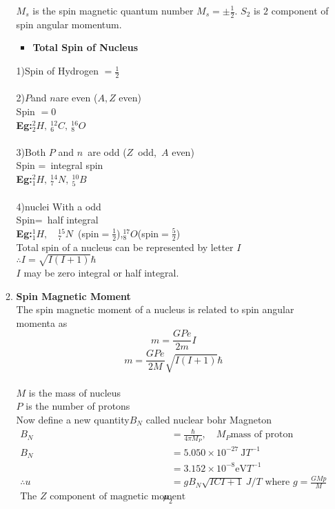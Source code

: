 \begin{enumerate}
\begin{enumerate}
$M_s$ is the spin magnetic quantum number $M_s=\pm\frac{1}{2}$. $S_2$ is $2 $ component of spin angular momentum.
\begin{itemize}
	\item \textbf{Total Spin of Nucleus}
\end{itemize}
1)\quad Spin of Hydrogen $=\frac{1}{2}$\\\\
2)\quad $P$and $n$are even ($A,Z$ even)\\
Spin $=0$\\
\textbf{Eg:}\quad $^2_2 H,\  ^{12}_6 C,\ ^{16}_8 O$\\\\
3)\quad Both $P$ and $n$\ are odd ($Z$\ odd,\ $A$ even)\\
Spin =\ integral spin\\
\textbf{Eg:}\quad $^2_1 H,\  ^{14}_7 N,\ ^{10}_5 B$\\\\
4)\quad nuclei With a odd\\
Spin=\ half integral\\
\textbf{Eg:}\quad $^1_1 H,\quad ^{15}_7 N$\ (spin$=\frac{1}{2}$),\quad$^{17}_8 O$(spin$=\frac{5}{2}$)\\
Total spin of a nucleus can be represented by letter $I$\\
$\therefore I=\sqrt{I(I+1)}\hbar$\\
$I$ may be zero integral or half integral.\\
	\item \textbf{Spin Magnetic Moment}\\
The spin magnetic moment of a nucleus is related to spin angular momenta as $$m=\frac{GPe}{2m}I$$
$$m=\frac{GPe}{2M}\sqrt{I(I+1)}\hbar$$\\
$M$ is the mass of nucleus\\
$P$ is the number of protons \\
Now define a new quantity$B_N$ called nuclear bohr Magneton\\
\begin{align*}
B_N&=\frac{\hbar}{4\pi M_P},\quad M_P \text{mass of proton}\\
B_{N}&=5.050 \times 10^{-2 7} \mathrm{~J}{T}^{-1}\\
&=3.152 \times 10^{-8} \mathrm{eV} T^{-1}\\
\therefore u&=g B_{N} \sqrt{I C I+1} \ J / T \text{ where } g=\frac{G M p}{M}\\
\text{The $Z$ component of magnetic moment}\mu_2\\

\end{align*}
\end{enumerate}
\end{enumerate}
